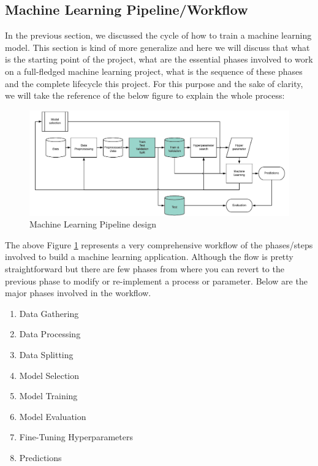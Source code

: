 \subsection{Machine Learning Pipeline/Workflow}
In the previous section, we discussed the cycle of how to train a machine learning model. This section is kind of more generalize and here we will discuss that what is the starting point of the project, what are the essential phases involved to work on a full-fledged machine learning project, what is the sequence of these phases and the complete lifecycle this project. For this purpose and the sake of clarity, we will take the reference of the below figure to explain the whole process:
\begin{figure}[H]
\centering
\includegraphics[scale=0.3]{images/Chapter2/ml-pipeline.jpg}
\caption{Machine Learning Pipeline design \cite{ml-pipeline}}
\label{ml-pipeline}
\end{figure}
\par
The above Figure \ref{ml-pipeline} represents a very comprehensive workflow of the phases/steps involved to build a machine learning application. Although the flow is pretty straightforward but there are few phases from where you can revert to the previous phase to modify or re-implement a process or parameter. Below are the major phases involved in the workflow.
\newline
\begin{enumerate}
  \item Data Gathering
  \item  Data Processing
  \item  Data Splitting
  \item  Model Selection
  \item  Model Training
  \item  Model Evaluation
  \item  Fine-Tuning Hyperparameters
  \item  Predictions
\end{enumerate}
